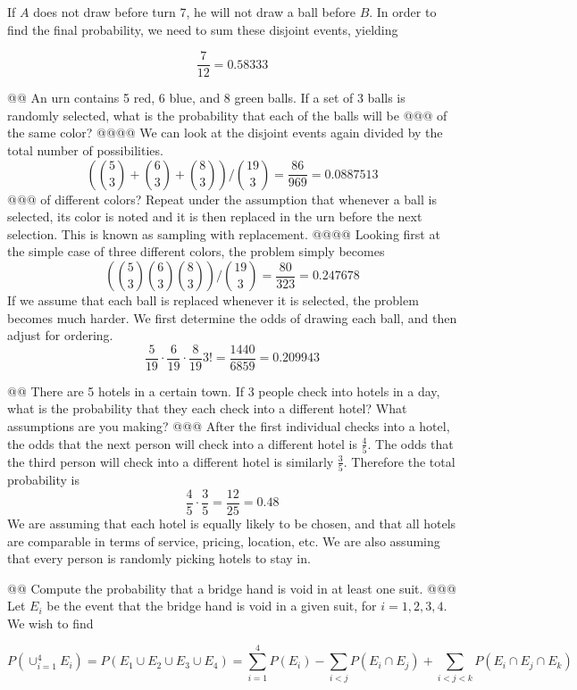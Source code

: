 \documentclass[10pt]{article}
\begin{document}
\begin{easylist}[enumerate]
        If $A$ does not draw before turn 7, he will not draw a ball before $B$. In order to find the final probability, we need to sum these disjoint events, yielding

        \[ \frac{7}{12} = \boxed{0.58333} \]

    @@ An urn contains 5 red, 6 blue, and 8 green balls.  If a set of 3 balls is randomly selected, what is the probability that each of the balls will be
    @@@ of the same color?
    @@@@ We can look at the disjoint events again divided by the total number of possibilities.
        \[ \left( \binom{5}{3} + \binom{6}{3} + \binom{8}{3}\right) \Big / \binom{19}{3} = \frac{86}{969} = \boxed{0.0887513} \]
    @@@ of different colors? Repeat under the assumption that whenever a ball is selected, its color is noted and it is then replaced in the urn before the next selection. This is known as sampling with replacement.
    @@@@ Looking first at the simple case of three different colors, the problem simply becomes
        \[ \left( \binom{5}{3} \binom{6}{3} \binom{8}{3} \right) \Big / \binom{19}{3} = \frac{80}{323} = \boxed{0.247678} \]
        If we assume that each ball is replaced whenever it is selected, the problem becomes much harder. We first determine the odds of drawing each ball, and then adjust for ordering.
        \[ \frac{5}{19} \cdot \frac{6}{19} \cdot \frac{8}{19} 3! = \frac{1440}{6859} = \boxed{0.209943} \]

    @@ There are 5 hotels in a certain town. If 3 people check into hotels in a day, what is the probability that they each check into a different hotel? What assumptions are you making?
    @@@ After the first individual checks into a hotel, the odds that the next person will check into a different hotel is $\frac{4}{5}$. The odds that the third person will check into a different hotel is similarly $\frac{3}{5}$. Therefore the total probability is
        \[ \frac{4}{5} \cdot \frac{3}{5} = \frac{12}{25} = \boxed{0.48} \]
        We are assuming that each hotel is equally likely to be chosen, and that all hotels are comparable in terms of service, pricing, location, etc. We are also assuming that every person is randomly picking hotels to stay in.

    @@ Compute the probability that a bridge hand is void in at least one suit.
    @@@ Let $E_i$ be the event that the bridge hand is void in a given suit, for $i=1, 2, 3, 4$. We wish to find

    \[ P(\cup^4_{i=1}E_i) = P(E_1 \cup E_2 \cup E_3 \cup E_4) = \sum^4_{i=1} P(E_i) - \sum_{i < j} P(E_i \cap E_j) + \sum_{i < j < k} P(E_i \cap E_j \cap E_k) \]


\end{easylist}
\end{document}
